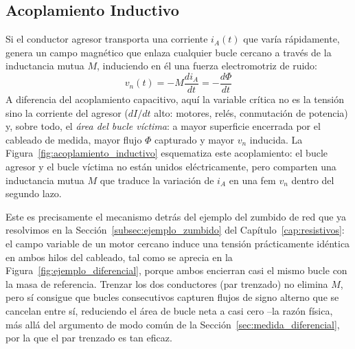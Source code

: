 \subsection{Acoplamiento Inductivo}\label{sub:acoplamiento_inductivo}

Si el conductor agresor transporta una corriente $i_A(t)$ que varía rápidamente, genera un campo magnético que enlaza cualquier bucle cercano a través de la inductancia mutua $M$, induciendo en él una fuerza electromotriz de ruido:
\begin{equation}\label{eq:acoplo_inductivo}
    v_n(t) = -M \frac{di_A}{dt} = -\frac{d\Phi}{dt}
\end{equation}
A diferencia del acoplamiento capacitivo, aquí la variable crítica no es la tensión sino la corriente del agresor ($dI/dt$ alto: motores, relés, conmutación de potencia) y, sobre todo, el \emph{área del bucle víctima}: a mayor superficie encerrada por el cableado de medida, mayor flujo $\Phi$ capturado y mayor $v_n$ inducida. La Figura~\ref{fig:acoplamiento_inductivo} esquematiza este acoplamiento: el bucle agresor y el bucle víctima no están unidos eléctricamente, pero comparten una inductancia mutua $M$ que traduce la variación de $i_A$ en una fem $v_n$ dentro del segundo lazo.

\begin{marginfigure}
    \centering
    \shorthandoff{>}
    \caption[Modelo del acoplamiento inductivo.]{Modelo del acoplamiento inductivo. La corriente variable del bucle agresor genera un flujo magnético que, a través de la inductancia mutua $M$, induce una tensión de ruido $v_n$ en el bucle víctima.}\label{fig:acoplamiento_inductivo}
\end{marginfigure}

Este es precisamente el mecanismo detrás del ejemplo del zumbido de red que ya resolvimos en la Sección~\ref{subsec:ejemplo_zumbido} del Capítulo~\ref{cap:resistivos}: el campo variable de un motor cercano induce una tensión prácticamente idéntica en ambos hilos del cableado, tal como se aprecia en la Figura~\ref{fig:ejemplo_diferencial}, porque ambos encierran casi el mismo bucle con la masa de referencia. Trenzar los dos conductores (par trenzado) no elimina $M$, pero sí consigue que bucles consecutivos capturen flujos de signo alterno que se cancelan entre sí, reduciendo el área de bucle neta a casi cero --la razón física, más allá del argumento de modo común de la Sección~\ref{sec:medida_diferencial}, por la que el par trenzado es tan eficaz.

